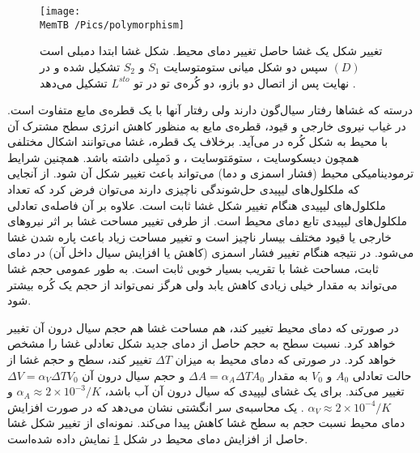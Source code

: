 \begin{figure}[h]
\begin{center}
\texttt{[image: \\MemTB /Pics/polymorphism]}
\caption{
تغییر شکل یک غشا حاصل تغییر دمای محیط. شکل غشا ابتدا دمبلی است 
$(D)$
سپس دو شکل میانی ستومتوسایت
$S_1$
و
$S_2$
تشکیل شده و در نهایت پس از اتصال دو بازو، دو کُره‌ی تو در تو 
$L^{sto}$
تشکیل می‌دهد 
\cite{Berndl1990EPL}.
}
\label{fig:shapeChanges}
\end{center}
\end{figure}

درسته که غشاها رفتار سیال‌گون دارند ولی رفتار آنها با یک قطره‌ی مایع متفاوت است. در غیاب نیروی خارجی و قیود، قطره‌ی مایع به منظور کاهش انرژی سطح مشترک آن با محیط به شکل کُره در می‌آید. برخلاف یک قطره، غشا می‌توانند اشکال مختلفی همچون دیسکوسایت
، ستومَتوسایت
، و  دَمبِلی داشته باشد. همچنین شرایط ترمودینامیکی محیط (فشار اسمزی و دما) می‌تواند باعث تغییر شکل آن شود. از آنجایی که ملکلول‌های لیپیدی حل‌شوندگی ناچیزی دارند می‌توان فرض کرد که تعداد ملکلول‌های لیپیدی هنگام تغییر شکل غشا ثابت است. علاوه بر آن فاصله‌ی تعادلی ملکلول‌های لیپیدی تابع دمای محیط است. از طرفی تغییر مساحت غشا بر اثر نیرو‌های خارجی یا قیود مختلف بیسار ناچیز است و تغییر مساحت زیاد باعث پاره شدن غشا می‌شود. در نتیجه هنگام تغییر فشار اسمزی (کاهش یا افزایش سیال داخل آن)  در دمای ثابت، مساحت غشا با تقریب بسیار خوبی ثابت است. به طور عمومی حجم غشا می‌تواند به مقدار خیلی زیادی کاهش یابد ولی هرگز نمی‌تواند از حجم یک کُره بیشتر شود. 

در صورتی که دمای محیط تغییر کند، هم مساحت غشا هم حجم سیال درون آن تغییر خواهد کرد. نسبت سطح به حجم حاصل از دمای جدید شکل تعادلی غشا را مشخص خواهد کرد. در صورتی که دمای محیط به میزان 
$\Delta T$
تغییر کند، سطح و حجم غشا از حالت تعادلی
$A_0$
و
$V_0$
به مقدار 
$\Delta A=\alpha_A\Delta T A_0$
و حجم سیال درون آن 
$\Delta V=\alpha_V\Delta T V_0$
تغییر می‌کند. برای یک غشای لیپیدی که سیال درون آن آب باشد،
$\alpha_A\approx2\times 10^{-3}/K$
و
$\alpha_V\approx2\times 10^{-4}/K$
. یک محاسبه‌ی سر انگشتی نشان می‌دهد که در صورت افزایش دمای محیط نسبت حجم به سطح غشا کاهش پیدا می‌کند. نمونه‌ای از تغییر شکل غشا حاصل از افزایش دمای محیط در شکل 
\ref{fig:shapeChanges}
نمایش داده شده‌است.

